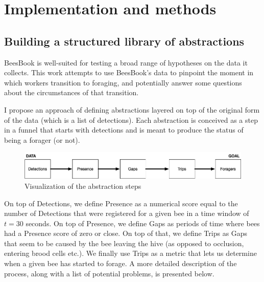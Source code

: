 
\chapter{Implementation and methods}  %

\ifpdf
    \graphicspath{{Chapters/Chapter3/Figs/Raster/}{Chapters/Chapter3/Figs/PDF/}{Chapters/Chapter3/Figs/}}
\else
    \graphicspath{{Chapters/Chapter3/Figs/Vector/}{Chapters/Chapter3/Figs/}}
\fi


\section{Building a structured library of abstractions}

BeesBook is well-suited for testing a broad range of hypotheses %
on the data it collects. This work attempts to use BeesBook’s data
to pinpoint the moment in which workers transition to foraging, and potentially
answer some questions about the circumstances of that transition. 

I propose an approach of defining abstractions layered on top of the original
form of the data (which is a list of detections). Each abstraction is conceived
as a step in a funnel that starts with detections and is meant to produce the
status of being a forager (or not).

\begin{figure}[htbp!] 
\centering    
\includegraphics[width=1.0\textwidth]{basic_funnel}
\caption[basic_funnel]{Visualization of the abstraction steps}
\label{fig:basic_funnel}
\end{figure}

On top of Detections, we define Presence as a numerical score equal to the
number of Detections that were registered for a given bee in a time window of
$t=30$ seconds. On top of Presence, we define Gaps as periods of time where bees
had a Presence score of zero or close. On top of that, we define Trips as Gaps that
seem to be caused by the bee leaving the hive (as opposed to occlusion, entering
brood cells etc.). We finally use Trips as a metric that lets us determine when
a given bee has started to forage. A more detailed description of the process,
along with a list of potential problems, is presented below.


